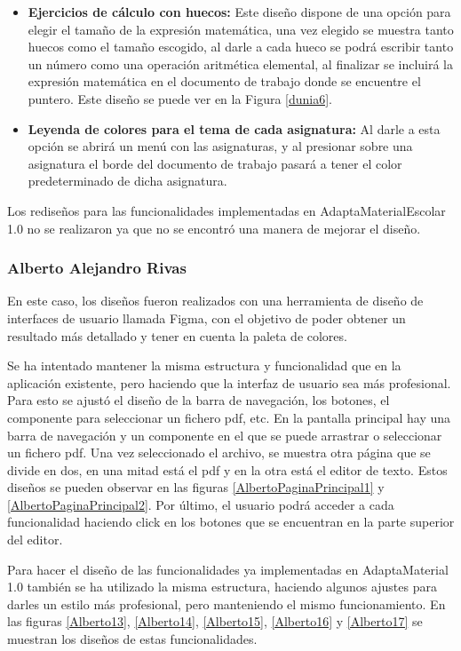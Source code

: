 \begin{itemize}
  \item  \textbf{Ejercicios de cálculo con huecos:} Este diseño dispone de una opción para elegir el tamaño de la expresión matemática, una vez elegido se muestra tanto huecos como el tamaño escogido, al darle a cada hueco se podrá escribir tanto un número como una operación aritmética elemental, al finalizar se incluirá la expresión matemática en el documento de trabajo donde se encuentre el puntero. Este diseño se puede ver en la Figura \ref{dunia6}.
  \item  \textbf{Leyenda de colores para el tema de cada asignatura:} Al darle a esta opción se abrirá un menú con las asignaturas, y al presionar sobre una asignatura el borde del documento de trabajo pasará a tener el color predeterminado de dicha asignatura.
\end{itemize}
Los rediseños para las funcionalidades implementadas en AdaptaMaterialEscolar 1.0 no se realizaron ya que no se encontró una manera de mejorar el diseño.

\subsubsection{Alberto Alejandro Rivas}
\label{sec:albertoIter}
En este caso, los diseños fueron realizados con una herramienta de diseño de interfaces de usuario llamada Figma, con el objetivo de poder obtener un resultado más detallado y tener en cuenta la paleta de colores.

Se ha intentado mantener la misma estructura y funcionalidad que en la aplicación existente, pero haciendo que la interfaz de usuario sea más profesional. Para esto se ajustó el diseño de la barra de navegación, los botones, el componente para seleccionar un fichero pdf, etc. En la pantalla principal hay una barra de navegación y un componente en el que se puede arrastrar o seleccionar un fichero pdf. Una vez seleccionado el archivo, se muestra otra página que se divide en dos, en una mitad está el pdf y en la otra está el editor de texto. Estos diseños se pueden observar en las figuras \ref{AlbertoPaginaPrincipal1} y \ref{AlbertoPaginaPrincipal2}. Por último, el usuario podrá acceder a cada funcionalidad haciendo click en los botones que se encuentran en la parte superior del editor.

Para hacer el diseño de las funcionalidades ya implementadas en AdaptaMaterial 1.0 también se ha utilizado la misma estructura, haciendo algunos ajustes para darles un estilo más profesional, pero manteniendo el mismo funcionamiento. En las figuras \ref{Alberto13}, \ref{Alberto14}, \ref{Alberto15}, \ref{Alberto16} y \ref{Alberto17} se muestran los diseños de estas funcionalidades.

